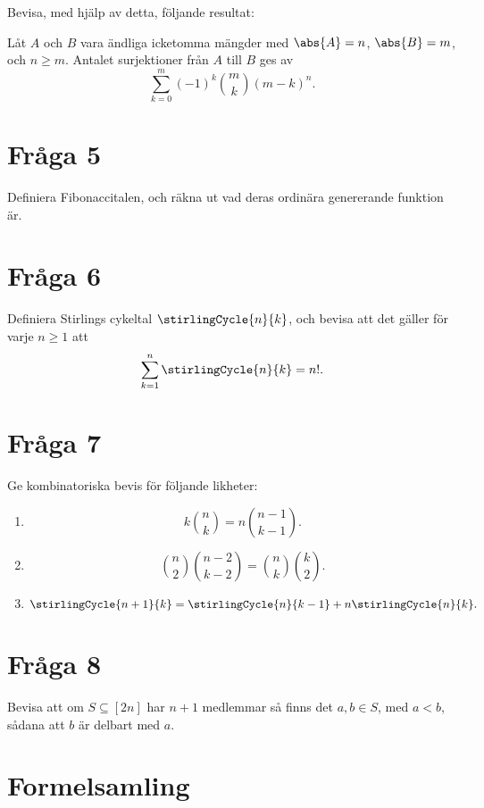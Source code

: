 \documentclass[nobib]{tufte-handout}
\begin{document}
Bevisa, med hjälp av detta, följande resultat:
\begin{theorem}\label{theorem_count_surjections}
  Låt $A$ och $B$ vara ändliga icketomma mängder med $\abs{A} = n$, $\abs{B} = m$, och $n \geq m$. Antalet surjektioner från $A$ till $B$ ges av
  $$\sum_{k=0}^{m} (-1)^k \binom{m}{k}(m-k)^n.$$
\end{theorem}

\section{Fråga 5} %
Definiera Fibonaccitalen, och räkna ut vad deras ordinära genererande funktion är.

\section{Fråga 6} %
Definiera Stirlings cykeltal $\stirlingCycle{n}{k}$, och bevisa att det gäller för varje $n \geq 1$ att
$$\sum_{k=1}^{n} \stirlingCycle{n}{k} = n!.$$

\section{Fråga 7} %
Ge kombinatoriska bevis för följande likheter:
\begin{enumerate}
  \item $$k\binom{n}{k} = n\binom{n-1}{k-1}.$$
  \item $$\binom{n}{2}\binom{n-2}{k-2} = \binom{n}{k}\binom{k}{2}.$$
  \item $$\stirlingCycle{n+1}{k} = \stirlingCycle{n}{k-1} + n\stirlingCycle{n}{k}.$$
\end{enumerate}

\section{Fråga 8} %
Bevisa att om $S \subseteq [2n]$ har $n+1$ medlemmar så finns det $a, b \in S$, med $a < b$, sådana att $b$ är delbart med $a$.

\pagebreak

\section{Formelsamling}
\end{document}
